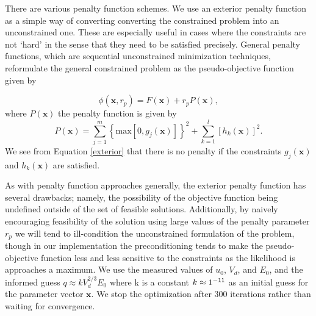 \documentclass[12pt,a4paper,oneside]{book}
\begin{document}
There are various penalty function schemes. We use an exterior penalty function as a simple way of converting converting the constrained problem into an unconstrained one. These are especially useful in cases where the constraints are not `hard' in the sense that they need to be satisfied precisely. General penalty functions, which are sequential unconstrained minimization techniques, reformulate the general constrained problem as the pseudo-objective function given by

\[ \phi(\mathbf{x}, r_p ) = F(\mathbf{x}) + r_p P(\mathbf{x}), \]
where $P \left( \mathbf{x} \right)$ the penalty function is given by
\begin{equation} \label{exterior}
 P( \mathbf{x} ) = \sum_{j = 1}^m \left\lbrace \mbox{max} \left[ 0, g_j(\mathbf{x} ) \right] \right\rbrace^2 + 
\sum_{k = 1}^l \left[ h_k( \mathbf{x}) \right]^2 .
\end{equation}
We see from Equation \ref{exterior} that there is no penalty if the constraints $g_j(\mathbf{x})$ and $h_k(\mathbf{x})$ are satisfied.
 
As with penalty function approaches generally, the exterior penalty function has several drawbacks; namely, the possibility of the objective function being undefined outside of the set of feasible solutions. Additionally, by naively encouraging feasibility of the solution using large values of the penalty parameter $r_p$ we will tend to ill-condition the unconstrained formulation of the problem, though in our implementation the preconditioning tends to make the pseudo-objective function less and less sensitive to the constraints as the likelihood is approaches a maximum. We use the measured values of $u_0$, $V_d$, and $E_0$, and the informed guess $q \approx k V_d^{2/3} E_0$ where k is a constant $k \approx 1 \time 10^{-11}$ as an initial guess for the parameter vector $\mathbf{x}$. We stop the optimization after 300 iterations rather than waiting for convergence.
\end{document}
